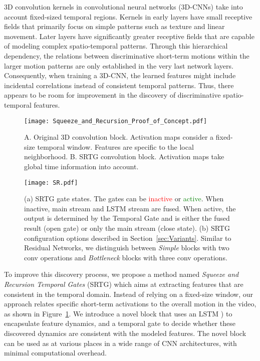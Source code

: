 \documentclass[final,5p,times,twocolumn]{elsarticle}
\begin{document}
3D convolution kernels in convolutional neural networks (3D-CNNs) take into account fixed-sized temporal regions. Kernels in early layers have small receptive fields that primarily focus on simple patterns such as texture and linear movement. Later layers have significantly greater receptive fields that are capable of modeling complex spatio-temporal patterns. Through this hierarchical dependency, the relations between discriminative short-term motions within the larger motion patterns are only established in the very last network layers. Consequently, when training a 3D-CNN, the learned features might include incidental correlations instead of consistent temporal patterns. Thus, there appears to be room for improvement in the discovery of discriminative spatio-temporal features.

\begin{figure}[!t]
\centering
\texttt{[image: Squeeze\_and\_Recursion\_Proof\_of\_Concept.pdf]}
\caption{A. Original 3D convolution block. Activation maps consider a fixed-size temporal window. Features are specific to the local neighborhood. B. SRTG convolution block. Activation maps take global time information into account.}
\label{fig:SRTG_PoC}
\end{figure}

\begin{figure*}
\centering
\texttt{[image: SR.pdf]}
\caption{(a) SRTG gate states. The gates can be \textcolor{red}{inactive} or \textcolor{green}{active}. When inactive, main stream and LSTM stream are fused. When active, the output is determined by the Temporal Gate and is either the fused result (open gate) or only the main stream (close state). (b) SRTG configuration options described in Section~\ref{sec:Variants}. Similar to Residual Networks, we distinguish between \textit{Simple} blocks with two conv operations and \textit{Bottleneck} blocks with three conv operations.}
\label{fig:SR_pipeline}
\end{figure*}

To improve this discovery process, we propose a method named \textit{Squeeze and Recursion Temporal Gates} (SRTG) which aims at extracting features that are consistent in the temporal domain. Instead of relying on a fixed-size window, our approach relates specific short-term activations to the overall motion in the video, as shown in Figure~\ref{fig:SRTG_PoC}. We introduce a novel block that uses an LSTM \citep{hochreiter1997long}) to encapsulate feature dynamics, and a temporal gate to decide whether these discovered dynamics are consistent with the modeled features. The novel block can be used as at various places in a wide range of CNN architectures, with minimal computational overhead.
\end{document}
